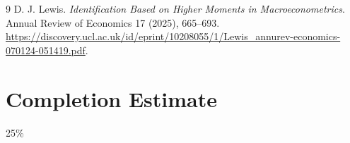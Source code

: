 \documentclass[11pt]{article}
\theoremstyle{definition}
\begin{document}
\begin{thebibliography}{9}
 D. J. Lewis.
\emph{Identification Based on Higher Moments in Macroeconometrics}.
Annual Review of Economics 17 (2025), 665--693.
\url{https://discovery.ucl.ac.uk/id/eprint/10208055/1/Lewis_annurev-economics-070124-051419.pdf}.
\end{thebibliography}
\section{Completion Estimate}
25\%
\end{document}
